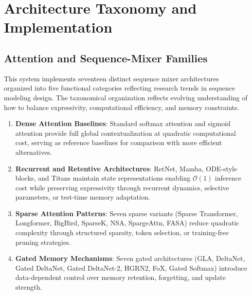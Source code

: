 \documentclass[11pt,a4paper]{article}
\begin{document}
\section{Architecture Taxonomy and Implementation}
\label{sec:architecture-taxonomy}

\subsection{Attention and Sequence-Mixer Families}
\label{sec:attention-families}

This system implements seventeen distinct sequence mixer architectures organized into five functional categories reflecting research trends in sequence modeling design. The taxonomical organization reflects evolving understanding of how to balance expressivity, computational efficiency, and memory constraints.

\begin{enumerate}[leftmargin=*]
    \item \textbf{Dense Attention Baselines}: Standard softmax attention and sigmoid attention provide full global contextualization at quadratic computational cost, serving as reference baselines for comparison with more efficient alternatives.
    \item \textbf{Recurrent and Retentive Architectures}: RetNet, Mamba, ODE-style blocks, and Titans maintain state representations enabling $\mathcal{O}(1)$ inference cost while preserving expressivity through recurrent dynamics, selective parameters, or test-time memory adaptation.
    \item \textbf{Sparse Attention Patterns}: Seven sparse variants (Sparse Transformer, Longformer, BigBird, SparseK, NSA, SpargeAttn, FASA) reduce quadratic complexity through structured sparsity, token selection, or training-free pruning strategies.
    \item \textbf{Gated Memory Mechanisms}: Seven gated architectures (GLA, DeltaNet, Gated DeltaNet, Gated DeltaNet-2, HGRN2, FoX, Gated Softmax) introduce data-dependent control over memory retention, forgetting, and update strength.
\end{enumerate}
\end{document}
